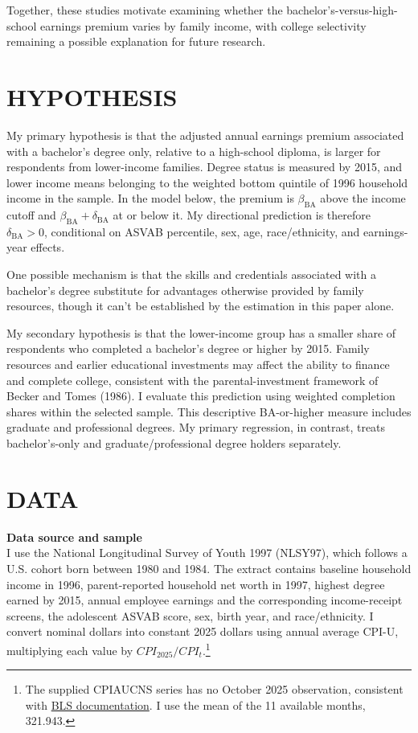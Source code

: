 \documentclass[12pt,letterpaper]{article}
\begin{document}
Together, these studies motivate examining whether the bachelor’s-versus-high-school 
earnings premium varies by family income, with college selectivity remaining a possible
 explanation for future research.

\section*{HYPOTHESIS}
My primary hypothesis is that the adjusted annual earnings premium associated with
a bachelor's degree only, relative to a high-school diploma, is larger for respondents
from lower-income families. Degree status is measured by 2015, and lower income
means belonging to the weighted bottom quintile of 1996 household income in the sample. 
In the model below, the premium is $\beta_{\mathrm{BA}}$ above the
income cutoff and $\beta_{\mathrm{BA}}+\delta_{\mathrm{BA}}$ at or below it.
My directional prediction is therefore $\delta_{\mathrm{BA}}>0$,
conditional on ASVAB percentile, sex, age, race/ethnicity, and earnings-year effects.\newline

One possible mechanism is that the skills and credentials associated with a
bachelor's degree substitute for advantages otherwise provided by family resources, 
though it can't be established by the estimation in this paper alone. \newline

My secondary hypothesis is that the lower-income group has a smaller share of
respondents who completed a bachelor's degree or higher by 2015. Family resources
and earlier educational investments may affect the ability to finance and complete
college, consistent with the parental-investment framework of Becker and Tomes
(1986). I evaluate this prediction using weighted completion shares within the
selected sample. This descriptive BA-or-higher measure includes graduate and
professional degrees. My primary regression, in contrast, treats bachelor's-only and
graduate/professional degree holders separately.\newline

\section*{DATA}
\textbf{Data source and sample}\\
I use the National Longitudinal Survey of Youth 1997 (NLSY97), which follows a
U.S. cohort born between 1980 and 1984. The extract contains baseline household
income in 1996, parent-reported household net worth in 1997, highest degree earned
by 2015, annual employee earnings and the corresponding income-receipt screens,
the adolescent ASVAB score, sex, birth year, and race/ethnicity. I convert nominal dollars into constant 2025 dollars using annual average CPI-U,
multiplying each value by $CPI_{2025}/CPI_t$.\footnote{The supplied CPIAUCNS series
has no October 2025 observation, consistent with
\href{https://www.bls.gov/news.release/archives/cpi_12182025.htm}{BLS documentation}.
I use the mean of the 11 available months, 321.943.}\newline
\end{document}

